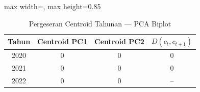 \begin{table}[H]
\centering
\caption{Pergeseran Centroid Tahunan --- PCA Biplot} \label{tab:samplecentroid_pca}
\begin{adjustbox}{max width=\textwidth, max height=0.85\textheight}
\begin{tabular}{|c|c|c|c|}
\hline
\textbf{Tahun} & \textbf{Centroid PC1} & \textbf{Centroid PC2} & \textbf{$D(c_t, c_{t+1})$} \\
\hline
2020 & 0 & 0 & 0 \\
2021 & 0 & 0 & 0 \\
2022 & 0 & 0 & -- \\
\hline
\end{tabular}
\end{adjustbox}
\end{table}
